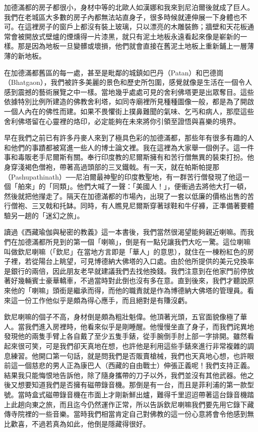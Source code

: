 加德滿都的房子都很小，身材中等的北歐人如漢娜和我來到尼泊爾後就成了巨人。我們在老城區大多數的房子內都無法站直身子，很多時候就連伸展一下身體也不可。在這裡房子的窗戶上都沒有裝上玻璃，只以漂亮的木雕裝飾；牆壁和天花板通常會被開放式壁爐的煙燻得一片漆黑，就只有泥土地板永遠看起來像是嶄新的一樣。那是因為地板一旦變髒或壞損，他們就會直接在舊泥土地板上重新鋪上一層薄薄的新地板。

在加德滿都舊區的每一處，甚至是毗鄰的城鎮如巴丹（Patan）和巴德崗（Bhatgaon），我們被許多美麗的景色和歷史所包圍，感覺就像是生活在一個令人感到震撼的藝術展覽之中一樣。當地幾乎處處可見的舍利佛塔更是出眾奪目。這些依據特別比例所建造的佛教舍利塔，如同寺廟裡所見種種圖像一般，都是為了開啟一個人內在的佛性而建。如果不畏懼街上撲鼻難聞的氣味、乞丐和病人，那麼這些舍利佛塔留在心靈裡的烙印，必定能夠在未來將你引領至證悟與喜樂的境界。

早在我們之前已有許多丹麥人來到了極具色彩的加德滿都，那些年有很多有趣的人和他們的事蹟都被寫進一些人的博士論文裡。我在這裡為大家舉一個例子。這一件事和毒販老手尼爾斯有關。奉行印度教的尼爾斯擁有和苦行僧無異的裝束打扮。他身穿淺褐色僧袍，帶著高過頭部的三叉鐵戟。有一天，就在帕斯帕提那（Pashupathinath）──尼泊爾最神聖的印度教聖地，有一群苦行僧發現了他這一個「舶來」的「同類」。他們大喊了一聲：「美國人！」，便衝過去將他大打一頓，然後就把他攆走了。隔天在加德滿都的市場內，出現了一套以低廉的價格出售的苦行僧袍、三叉戟和托缽。同時，有人瞧見尼爾斯穿著球鞋和牛仔褲，正準備著要體驗另一趟的「迷幻之旅」。

讀過《西藏瑜伽與秘密的教義》這一本書後，我們當然很渴望能夠親近喇嘛。而我們在加德滿都所見到的第一個「喇嘛」，倒是有一點兒讓我們大吃一驚。這位喇嘛叫做欽尼喇嘛（「欽尼」在當地方言即是「華人」的意思），就住在一棟粉紅色的房子裡，若從陽台上眺望，可見博德納大佛塔的入口處。由於他所提供的美元兌換率是銀行的兩倍，因此朋友老早就建議我們去找他換錢。我們注意到在他家門前停放著好幾輛賓士豪華轎車，不過當時對此倒也沒有多在意。直到後來，我們才聽說原來他的「喇嘛」頭銜是繼承而得，而他的職責就是作為博德納大佛塔的管理員。看來這一份工作他似乎是頗為得心應手，而且絕對是有賺沒虧。

欽尼喇嘛的個子不高，身材倒是頗為粗壯魁偉。他頂著光頭，五官面貌像極了華人。當我們進入房裡時，他看來似乎是剛睡醒。他慢慢坐直了身子，而我們詫異地發現他的兩隻手臂上各自戴了至少五隻手錶，從手腕倒手肘上部一字排開。雖然看起來很可笑，可是我們卻天真地在想，也許他是利用這些手錶來進行非常複雜的調息練習。他開口第一句話，就是問我們是否販賣槍械，我們也天真地心想，也許眼前這一個慈悲的男人正為康巴人（西藏的自由戰士）伸張正義呢！我們支持正義。結果我只能悔恨地告訴他，除了隨身攜帶的刀子以外，我們並沒有其他武器。他之後又想要知道我們是否擁有磁帶錄音機。那倒是有一台，而且是菲利浦的第一款型號。當時盒式磁帶錄音機在市面上才剛新鮮出爐，難得千里迢迢帶著這台錄音機踏上此趟向東之旅，而且迄今仍然運作正常，所以告訴欽尼喇嘛我們要先用它錄下藏傳寺院裡的一些音樂。當時我們相當肯定自己對佛教的這一份心意將會令他感到無比歡喜，不過若真為如此，他倒是隱藏得很好。

